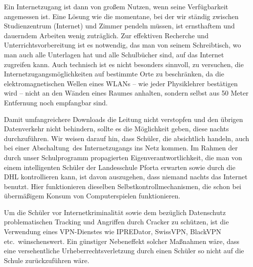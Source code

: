 \documentclass[10pt,a4paper,notitlepage]{scrartcl}
\newcommand{\gfo}{\grqq\ }
\newcommand{\gfu}{\glqq}
\begin{document}
\begin{multicols}{2}
Ein Internetzugang ist dann von großem Nutzen, wenn seine Verfügbarkeit angemessen ist. Eine Lösung wie die momentane, bei der wir ständig zwischen Studienzentrum (\gfu Internet\grqq) und Zimmer pendeln müssen, ist ernsthaftem und dauerndem Arbeiten wenig zuträglich. Zur effektiven Recherche und Unterrichtsvorbereitung ist es notwendig, das man von seinem Schreibtisch, wo man auch alle Unterlagen hat und alle Schulbücher sind, auf das Internet zugreifen kann. Auch technisch ist es nicht besonders sinnvoll, zu versuchen, die Internetzugangsmöglichkeiten auf bestimmte Orte zu beschränken, da die elektromagnetischen Wellen eines WLANs -- wie jeder Physiklehrer bestätigen wird -- nicht an den Wänden eines Raumes \gfu anhalten\grqq, sondern selbst aus 50 Meter Entfernung noch empfangbar sind.

Damit umfangreichere Downloads die Leitung nicht verstopfen und den übrigen Datenverkehr nicht behindern, sollte es die Möglichkeit geben, diese nachts durchzuführen. Wir weisen darauf hin, dass Schüler, die absichtlich handeln, auch bei einer \gfu Abschaltung\gfo des Internetzugangs ins Netz kommen. Im Rahmen der durch unser Schulprogramm propagierten Eigenverantwortlichkeit, die man von einem intelligenten Schüler der Landesschule Pforta erwarten sowie durch die DHL kontrollieren kann, ist davon auszugehen, dass niemand nachts das Internet benutzt. Hier funktionieren dieselben Selbstkontrollmechanismen, die schon bei übermäßigem Konsum von Computerspielen funktionieren.

Um die Schüler vor Internetkriminalität sowie dem bezüglich Datenschutz problematischen Tracking und Angriffen durch Cracker zu schützen, ist die Verwendung eines VPN-Dienstes wie IPREDator, SwissVPN, BlackVPN etc.\ wünschenswert. Ein günstiger Nebeneffekt solcher Maßnahmen wäre, dass eine versehentliche Urheberrechtsverletzung durch einen Schüler so nicht auf die Schule zurückzuführen wäre.
\end{multicols}




%
\end{document}
